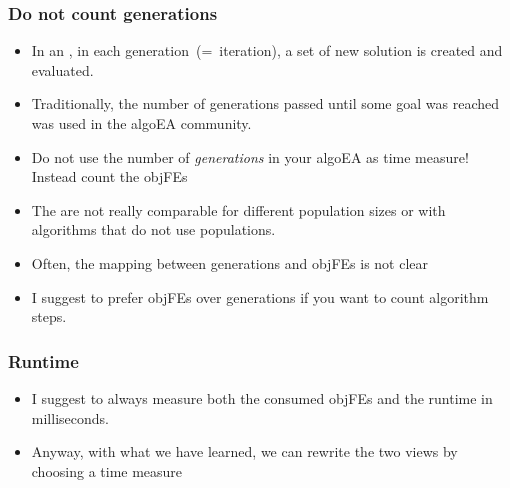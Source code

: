 \documentclass[aspectratio=169,mathserif,notheorems]{beamer}%
\begin{document}
\begin{frame}\frametitle{Do not count generations}%
\begin{itemize}%
\item In an \cite{W2009GOATAA,BFM1997EA}, in each generation~(=~iteration), a set of new solution is created and evaluated.%
\item<2-> Traditionally, the number of generations passed until some goal was reached was used in the \gls{algoEA} community.%
\item<3-> Do not use the number of \emph{generations} in your \gls{algoEA} as time measure! Instead count the \glspl{objFE}%
\item<4-> The  are not really comparable for different population sizes or with algorithms that do not use populations.%
\item<5-> Often, the mapping between generations and \glspl{objFE} is not clear%
%
\item<10-> I suggest to prefer \glspl{objFE} over generations if you want to count algorithm steps.%
%
\end{itemize}%
\end{frame}%
%
\begin{frame}%
\frametitle{Runtime}%
\begin{itemize}%
\item I suggest to always measure both the consumed \glspl{objFE} and the runtime in milliseconds.%
\item<2-> Anyway, with what we have learned, we can rewrite the two views by choosing a time measure\cite{WNT2010AAOAB,HAFR2010RPBBOB2ES}%
\end{itemize}%
\end{frame}%
\end{document}

